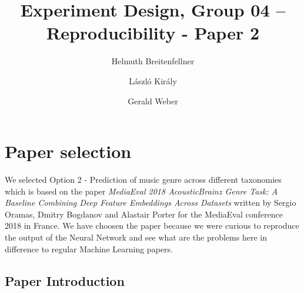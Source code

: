 \documentclass[sigconf,nonacm]{acmart}
\begin{document}
\title{Experiment Design, Group 04 -- Reproducibility - Paper 2}


\author{Helmuth Breitenfellner}
\affiliation{%
}

\author{L\'aszl\'o Kir\'aly}
\affiliation{%
}

\author{Gerald Weber}
\affiliation{%
}


\maketitle

\section{Paper selection}

We selected Option 2 - Prediction of music genre across different taxonomies which is based on the paper \textit{MediaEval 2018 AcousticBrainz Genre Task: A Baseline
Combining Deep Feature Embeddings Across Datasets} written by Sergio Oramas, Dmitry Bogdanov and Alastair Porter for the MediaEval conference 2018 in France.
We have choosen the paper because we were curious to reproduce the output of the Neural Network and see what are the problems here in difference to regular Machine Learning papers.


\subsection{Paper Introduction}
\end{document}
